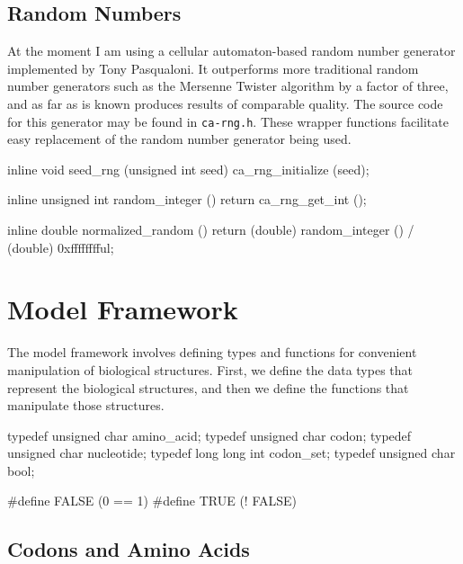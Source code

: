 \documentclass{article}
\begin{document}
    \subsection{Random Numbers}
      \label{sec:random}

      At the moment I am using a cellular automaton-based random number
      generator implemented by Tony Pasqualoni. It outperforms more traditional
      random number generators such as the Mersenne Twister algorithm by a
      factor of three, and as far as is known produces results of comparable
      quality. The source code for this generator may be found in
      \verb|ca-rng.h|. These wrapper functions facilitate easy replacement of
      the random number generator being used.

\begin{ccode}
inline void seed_rng (unsigned int seed)
  {ca_rng_initialize (seed);}

inline unsigned int random_integer ()
  {return ca_rng_get_int ();}

inline double normalized_random ()
  {return (double) random_integer () / (double) 0xfffffffful;}
\end{ccode}

  \section{Model Framework}
    \label{sec:framework}

    The model framework involves defining types and functions for convenient
    manipulation of biological structures. First, we define the data types that
    represent the biological structures, and then we define the functions that
    manipulate those structures.

\begin{ccode}
typedef unsigned char amino_acid;
typedef unsigned char codon;
typedef unsigned char nucleotide;
typedef long long int codon_set;
typedef unsigned char bool;

#define FALSE (0 == 1)
#define TRUE (! FALSE)
\end{ccode}

    \subsection{Codons and Amino Acids}
      \label{sec:codons-amino-acids}
\end{document}
